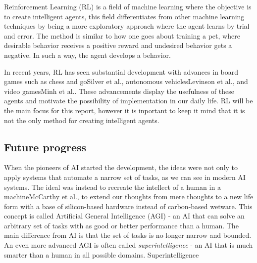 \documentclass[12pt,A4]{report}
\newcommand{\autobaj}{}
\theoremstyle{definition}
\begin{document}
Reinforcement Learning (RL) is a field of machine learning where the objective is to create intelligent agents, this field differentiates from other machine learning techniques by being a more exploratory approach where the agent learns by trial and error. The method is similar to how one goes about training a pet, where desirable behavior receives a positive reward and undesired behavior gets a negative. In such a way, the agent develops a behavior. %

In recent years, RL has seen substantial development with advances in board games such as chess and go\autobaj{Silver et al.}, autonomous vehicles\autobaj{Levinson et al.}, and video games\autobaj{Minh et al.}. These advancements display the usefulness of these agents and motivate the possibility of implementation in our daily life. RL will be the main focus for this report, however it is inportant to keep it mind that it is not the only method for creating intelligent agents. 



\subsection{Future progress}
When the pioneers of AI started the development, the ideas were not only to apply systems that automate a narrow set of tasks, as we can see in modern AI systems. The ideal was instead to recreate the intellect of a human in a machine\autobaj{McCarthy et al.}, to extend our thoughts from mere thoughts to a new life form with a base of silicon-based hardware instead of carbon-based wetware. This concept is called Artificial General Intelligence (AGI) - an AI that can solve an arbitrary set of tasks with as good or better performance than a human. The main difference from AI is that the set of tasks is no longer narrow and bounded. An even more advanced AGI is often called \textit{superintelligence} - an AI that is much smarter than a human in all possible domains. \autobaj{Superintelligence} 

\end{document}
